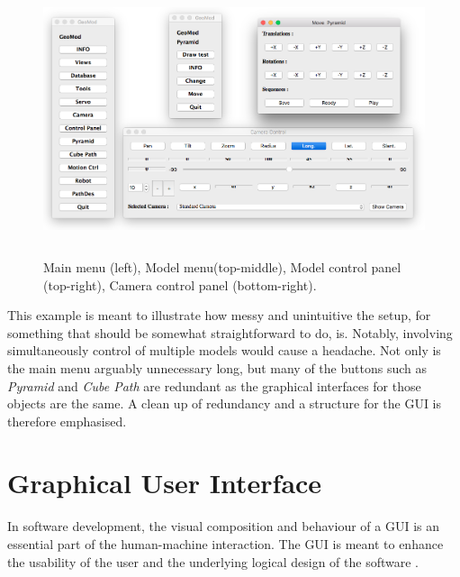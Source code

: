 \begin{figure}[ht]
    \centering
    \includegraphics[height=8cm]{images/example_control.png}
    \caption[Control panels]{Main menu (left), Model menu(top-middle), Model control panel (top-right), Camera control panel (bottom-right).}
    \label{fig:controlpanels}
\end{figure}

This example is meant to illustrate how messy and unintuitive the setup, for something that should be somewhat straightforward to do, is. Notably, involving simultaneously control of multiple models would cause a headache. Not only is the main menu arguably unnecessary long, but many of the buttons such as \textit{Pyramid} and \textit{Cube Path} are redundant as the graphical interfaces for those objects are the same. A clean up of redundancy and a structure for the GUI is therefore emphasised.

\section{Graphical User Interface}

In software development, the visual composition and behaviour of a GUI is an essential part of the human-machine interaction. The GUI is meant to enhance the usability of the user and the underlying logical design of the software \cite{gui}. 

